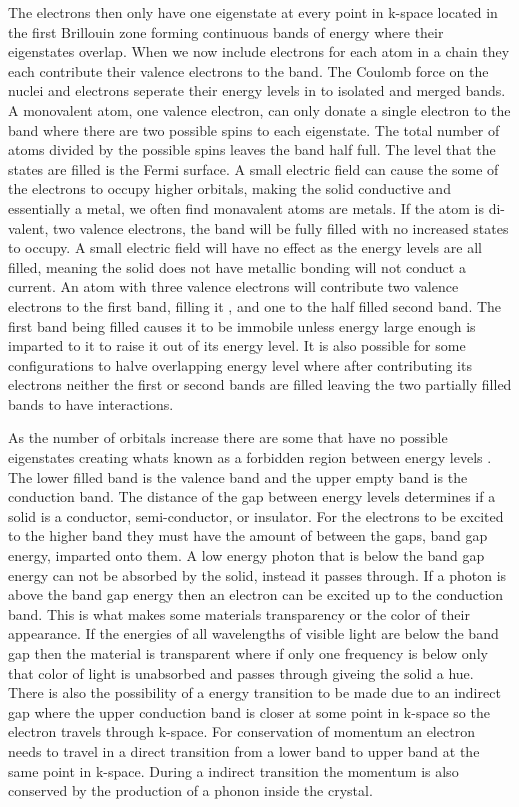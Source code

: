 \documentclass[prl,onecolumn]{revtex4-1}  %
\begin{document}
\par The electrons then only have one eigenstate at every point in k-space located in the first Brillouin zone forming continuous bands of energy where their eigenstates overlap. 
When we now include electrons for each atom in a chain they each contribute their valence electrons to the band. The Coulomb force on the nuclei and electrons seperate their energy levels in to isolated and merged bands\cite{Kittel}.  A monovalent atom, one valence electron, can only donate a single electron to the band where there are two possible spins to each eigenstate\cite{Simon}. The total number of atoms divided by the possible  spins leaves the band half full. The level that the states are filled is the Fermi surface. A small electric field can cause the some of the electrons to occupy higher orbitals, making the solid conductive and essentially a metal, we often find monavalent atoms are metals\cite{Simon}.  If the atom is di-valent, two valence electrons, the band will be fully filled with no increased states to occupy. A small electric field will have no effect as the energy levels are all filled, meaning the solid does not have metallic bonding will not conduct a current\cite{Simon}. An atom with three valence electrons will contribute two valence electrons to the first band, filling it , and one to the half filled second band. The first band being filled causes it to be immobile unless energy large enough is imparted to it to raise it out of its energy level\cite{Chen}. It is also possible for some configurations to halve overlapping energy level where after contributing its electrons neither the first or second bands are filled leaving the two partially filled bands to have interactions. 
\par
As the number of orbitals increase there are some that have no possible eigenstates creating whats known as a forbidden region between energy levels \cite{Levitin}. The lower filled band is the valence band and the upper empty band is the conduction band. The distance of the gap between energy levels determines if a solid is a conductor, semi-conductor, or insulator. For the electrons to be excited to the higher band they must have the amount of between the gaps, band gap energy, imparted onto them. A low energy photon that is below the band gap energy  can not be absorbed by the solid, instead it passes through. If a photon is above the band gap energy then an electron can be excited up to the conduction band. This is what makes some materials transparency or the color of their appearance. If the energies of all wavelengths of visible light are below the band gap then the material is transparent where if only one frequency is below only that color of light is unabsorbed and passes through giveing the solid a hue\cite{Simon}. There is also the possibility of a energy transition to be made due to an indirect gap where the upper conduction band is closer at some point in k-space so the electron travels through k-space. For conservation of momentum an electron needs to travel in a direct transition from a lower band to upper band at the same point in k-space. During a indirect transition the momentum is also conserved by the production of a phonon inside the crystal. \cite{Simon} 
\end{document}
